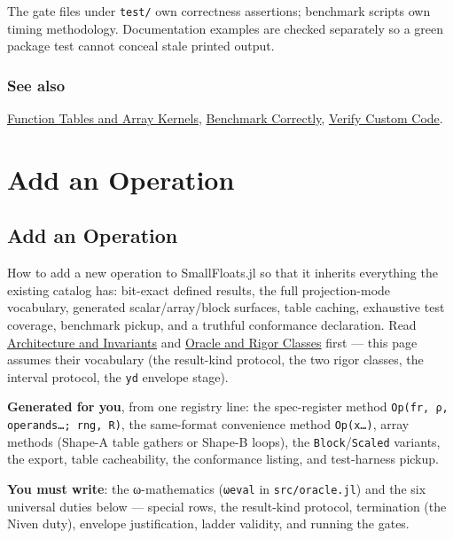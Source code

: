 The gate files under \texttt{test/} own correctness assertions; benchmark scripts own timing methodology. Documentation examples are checked separately so a green package test cannot conceal stale printed output.



\subsection{See also}



\label{292862844209942199-dup21}{}


\href{internals\_\allowbreak{}tables.md}{Function Tables and Array Kernels}, \href{internals\_\allowbreak{}benchmark.md}{Benchmark Correctly}, \href{internals\_\allowbreak{}verify\_\allowbreak{}custom.md}{Verify Custom Code}.



\chapter{Add an Operation}


\section{Add an Operation}



\label{9434017197269608002}{}


How to add a new operation to SmallFloats.jl so that it inherits everything the existing catalog has: bit-exact defined results, the full projection-mode vocabulary, generated scalar/array/block surfaces, table caching, exhaustive test coverage, benchmark pickup, and a truthful conformance declaration. Read \href{internals\_\allowbreak{}architecture.md}{Architecture and Invariants} and \href{internals\_\allowbreak{}oracle.md}{Oracle and Rigor Classes} first — this page assumes their vocabulary (the result-kind protocol, the two rigor classes, the interval protocol, the \texttt{yd} envelope stage).



\begin{tcolorbox}[toptitle=-1mm,bottomtitle=1mm,colback=admonition-note!50!white,colframe=admonition-note,title=\textbf{What{\textquotesingle}s generated vs what you write}]
\textbf{Generated for you}, from one registry line: the spec-register method \texttt{Op(\allowbreak{}fr, ρ, operands…; rng, R)}, the same-format convenience method \texttt{Op(x…)}, array methods (Shape-A table gathers or Shape-B loops), the \texttt{Block}/\allowbreak\texttt{Scaled} variants, the export, table cacheability, the conformance listing, and test-harness pickup.

\textbf{You must write}: the ω-mathematics (\texttt{ωeval} in \texttt{src/oracle.jl}) and the six universal duties below — special rows, the result-kind protocol, termination (the Niven duty), envelope justification, ladder validity, and running the gates.

\end{tcolorbox}



